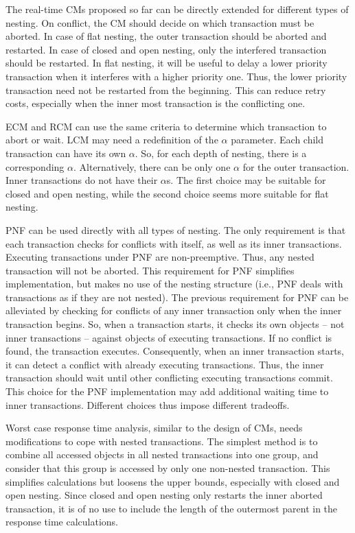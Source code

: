 \documentclass[12pt,english]{report}
\begin{document}
The real-time CMs proposed so far can be directly extended for different types of nesting. On conflict, the CM should decide on which transaction must be  aborted. In case of flat nesting, the outer transaction should be aborted and restarted. In case of closed and open nesting, only the interfered transaction should be restarted. In flat nesting, it will be useful to delay a lower priority transaction when it interferes with a higher priority one. Thus, the lower priority transaction need not be restarted from the beginning. This can reduce retry costs, especially when the inner most transaction is the conflicting one.


ECM and RCM can use the same criteria to determine which transaction to abort or wait. LCM may need a redefinition of the $\alpha$ parameter. Each child transaction can have its own $\alpha$. So, for each depth of nesting, there is a corresponding $\alpha$. Alternatively, there can be only one $\alpha$ for the outer transaction. Inner transactions do not have their $\alpha$s. The first choice may be suitable for closed and open nesting, while the second choice seems more suitable for flat nesting. 


PNF can be used directly with all types of nesting. The only requirement is that each transaction checks for conflicts with itself, as well as its inner transactions. Executing transactions under PNF are non-preemptive. Thus, any nested transaction will not be aborted. This requirement for PNF simplifies implementation, but makes no use of the nesting structure (i.e., PNF deals with transactions as if they are not nested). The previous requirement for PNF can be alleviated by checking for conflicts of any inner transaction only when the inner transaction begins. So, when a transaction starts, it checks its own objects -- not inner transactions -- against objects of executing transactions. If no conflict is found, the transaction executes. Consequently, when an inner transaction starts, it can detect a conflict with already executing transactions. Thus, the inner transaction should wait until other conflicting executing transactions commit. This choice for the PNF implementation may add additional waiting time to inner transactions. Different choices thus impose different tradeoffs. 


Worst case response time analysis, similar to the design of CMs, needs modifications  to cope with nested transactions. The simplest method is to combine all accessed objects in all nested transactions into one group, and consider that this group is accessed by only one non-nested transaction. This simplifies calculations but loosens the upper bounds, especially with closed and open nesting. Since closed and open nesting only restarts the inner aborted transaction, it is of no use to include the length of the outermost parent in the response time calculations.
\end{document}
